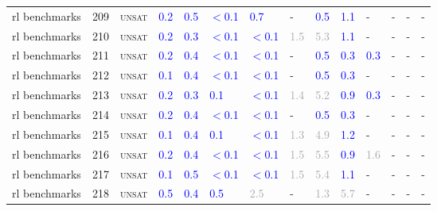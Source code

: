 \begin{center}
{\begin{longtable}{@{}llllllllllllll@{}}
rl benchmarks & 209 & \textsc{unsat} & \textcolor{blue}{0.2} & \textcolor{blue}{0.5} & \textcolor{blue}{$<$0.1} & \textcolor{blue}{0.7} & - & \textcolor{blue}{0.5} & \textcolor{blue}{1.1} & - & - & - & - \\
rl benchmarks & 210 & \textsc{unsat} & \textcolor{blue}{0.2} & \textcolor{blue}{0.3} & \textcolor{blue}{$<$0.1} & \textcolor{blue}{$<$0.1} & \textcolor{darkgray}{1.5} & \textcolor{darkgray}{5.3} & \textcolor{blue}{1.1} & - & - & - & - \\
rl benchmarks & 211 & \textsc{unsat} & \textcolor{blue}{0.2} & \textcolor{blue}{0.4} & \textcolor{blue}{$<$0.1} & \textcolor{blue}{$<$0.1} & - & \textcolor{blue}{0.5} & \textcolor{blue}{0.3} & \textcolor{blue}{0.3} & - & - & - \\
rl benchmarks & 212 & \textsc{unsat} & \textcolor{blue}{0.1} & \textcolor{blue}{0.4} & \textcolor{blue}{$<$0.1} & \textcolor{blue}{$<$0.1} & - & \textcolor{blue}{0.5} & \textcolor{blue}{0.3} & - & - & - & - \\
rl benchmarks & 213 & \textsc{unsat} & \textcolor{blue}{0.2} & \textcolor{blue}{0.3} & \textcolor{blue}{0.1} & \textcolor{blue}{$<$0.1} & \textcolor{darkgray}{1.4} & \textcolor{darkgray}{5.2} & \textcolor{blue}{0.9} & \textcolor{blue}{0.3} & - & - & - \\
rl benchmarks & 214 & \textsc{unsat} & \textcolor{blue}{0.2} & \textcolor{blue}{0.4} & \textcolor{blue}{$<$0.1} & \textcolor{blue}{$<$0.1} & - & \textcolor{blue}{0.5} & \textcolor{blue}{0.3} & - & - & - & - \\
rl benchmarks & 215 & \textsc{unsat} & \textcolor{blue}{0.1} & \textcolor{blue}{0.4} & \textcolor{blue}{0.1} & \textcolor{blue}{$<$0.1} & \textcolor{darkgray}{1.3} & \textcolor{darkgray}{4.9} & \textcolor{blue}{1.2} & - & - & - & - \\
rl benchmarks & 216 & \textsc{unsat} & \textcolor{blue}{0.2} & \textcolor{blue}{0.4} & \textcolor{blue}{$<$0.1} & \textcolor{blue}{$<$0.1} & \textcolor{darkgray}{1.5} & \textcolor{darkgray}{5.5} & \textcolor{blue}{0.9} & \textcolor{darkgray}{1.6} & - & - & - \\
rl benchmarks & 217 & \textsc{unsat} & \textcolor{blue}{0.1} & \textcolor{blue}{0.5} & \textcolor{blue}{$<$0.1} & \textcolor{blue}{$<$0.1} & \textcolor{darkgray}{1.5} & \textcolor{darkgray}{5.4} & \textcolor{blue}{1.1} & - & - & - & - \\
rl benchmarks & 218 & \textsc{unsat} & \textcolor{blue}{0.5} & \textcolor{blue}{0.4} & \textcolor{blue}{0.5} & \textcolor{darkgray}{2.5} & - & \textcolor{darkgray}{1.3} & \textcolor{darkgray}{5.7} & - & - & - & - \\

\end{longtable}}
\end{center}
